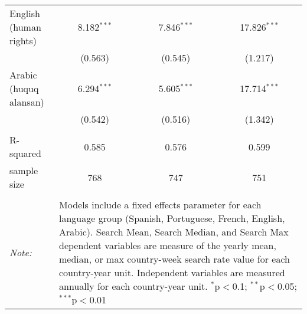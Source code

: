 \begin{table}[!htbp]
\begin{tabular}{@{\extracolsep{5pt}}lccc}
  English (human rights) & 8.182$^{***}$ & 7.846$^{***}$ & 17.826$^{***}$ \\ 
  & (0.563) & (0.545) & (1.217) \\ 
  Arabic (huquq alansan) & 6.294$^{***}$ & 5.605$^{***}$ & 17.714$^{***}$ \\ 
  & (0.542) & (0.516) & (1.342) \\ 
 \hline \\[-1.8ex] 
R-squared  & 0.585 & 0.576 & 0.599 \\ 
sample size  & 768 & 747 & 751 \\ 
\hline 
\hline \\[-1.8ex] 
\textit{Note:}  & \multicolumn{3}{l}{\parbox[t]{8cm}{Models include a fixed effects parameter for each language group (Spanish, Portuguese, French, English, Arabic). Search Mean, Search Median, and Search Max dependent variables are measure of the yearly mean, median, or max country-week search rate value for each country-year unit. Independent variables are measured annually for each country-year unit. $^{*}$p$<$0.1; $^{**}$p$<$0.05; $^{***}$p$<$0.01}} \\ 
\end{tabular} 
\end{table} 
